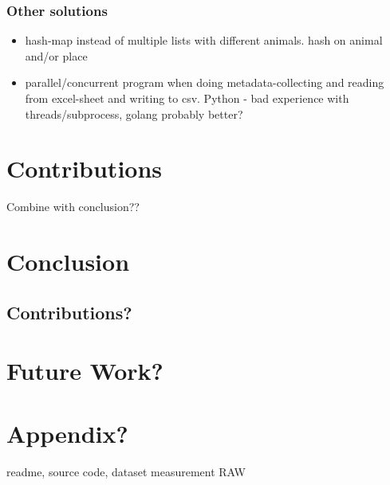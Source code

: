 \documentclass[USenglish]{uit-thesis}
\begin{document}
\subsection{Other solutions}
\begin{itemize}
\item hash-map instead of multiple lists with different animals. hash on animal and/or place
\item parallel/concurrent program when doing metadata-collecting and reading from excel-sheet and writing to csv. Python - bad experience with threads/subprocess, golang probably better?
\end{itemize}



\chapter{Contributions}
Combine with conclusion??
\chapter{Conclusion}
\section{Contributions?}

\chapter{Future Work?}

\chapter{Appendix?}
readme, source code, dataset measurement RAW
\backmatter



\newpage{}
\end{document}
